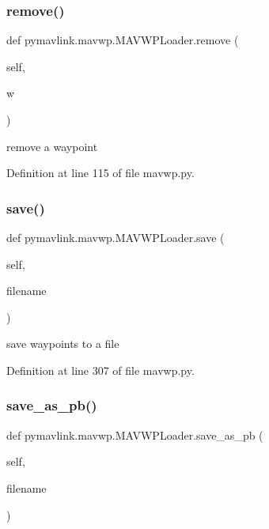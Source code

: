 \subsubsection{\texorpdfstring{remove()}{remove()}}
{\footnotesize\ttfamily def pymavlink.\+mavwp.\+M\+A\+V\+W\+P\+Loader.\+remove (\begin{DoxyParamCaption}\item[{}]{self,  }\item[{}]{w }\end{DoxyParamCaption})}

\begin{DoxyVerb}remove a waypoint\end{DoxyVerb}
 

Definition at line 115 of file mavwp.\+py.

\mbox{\label{classpymavlink_1_1mavwp_1_1MAVWPLoader_af1b338ee6356f5cbbae19fef1d37057d}} 
\subsubsection{\texorpdfstring{save()}{save()}}
{\footnotesize\ttfamily def pymavlink.\+mavwp.\+M\+A\+V\+W\+P\+Loader.\+save (\begin{DoxyParamCaption}\item[{}]{self,  }\item[{}]{filename }\end{DoxyParamCaption})}

\begin{DoxyVerb}save waypoints to a file\end{DoxyVerb}
 

Definition at line 307 of file mavwp.\+py.

\mbox{\label{classpymavlink_1_1mavwp_1_1MAVWPLoader_a41cdae76bea6868abf200f8b3541fe57}} 
\subsubsection{\texorpdfstring{save\_as\_pb()}{save\_as\_pb()}}
{\footnotesize\ttfamily def pymavlink.\+mavwp.\+M\+A\+V\+W\+P\+Loader.\+save\+\_\+as\+\_\+pb (\begin{DoxyParamCaption}\item[{}]{self,  }\item[{}]{filename }\end{DoxyParamCaption})}



